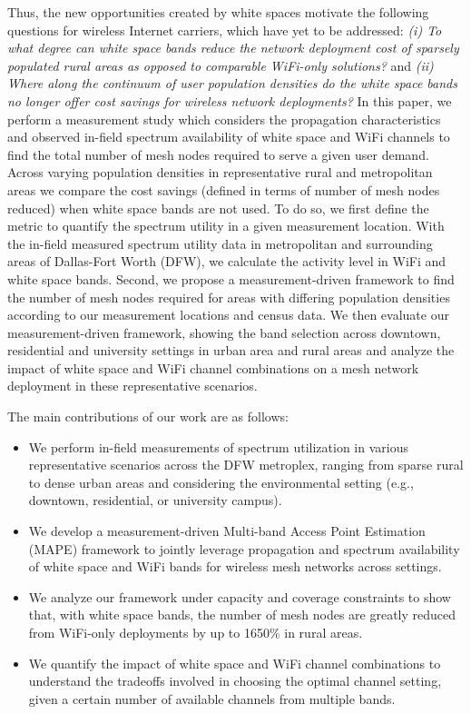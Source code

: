 Thus, the new opportunities created by white spaces motivate the following 
questions for wireless Internet carriers, which have yet to be addressed: 
{\it (i) To what degree can white space bands reduce the network deployment cost of
sparsely populated rural areas as opposed to comparable WiFi-only solutions?} and 
{\it (ii) Where along the continuum of user population densities do the white
space bands no longer offer cost savings for wireless network deployments?}
In this paper, we perform a measurement study which considers the propagation 
characteristics and observed in-field spectrum availability of white space
and WiFi channels to find the total number of mesh nodes required to serve a 
given user demand. Across varying population densities in representative 
rural and metropolitan areas we compare the cost savings (defined in terms of
number of mesh nodes reduced) when white space bands are not used.
To do so, we first define the metric to quantify the spectrum utility in a
given measurement location. With the in-field measured spectrum utility data 
in metropolitan and surrounding areas of Dallas-Fort Worth (DFW), we 
calculate the activity level in WiFi and white space bands. Second, we 
propose a measurement-driven framework to find the number of mesh nodes required 
for areas with differing population densities according to our measurement locations
and census data. We then evaluate our measurement-driven framework, showing
the band selection across downtown, residential and university settings in
urban area and rural areas and analyze the impact of white space and WiFi
channel combinations on a mesh network deployment in these representative scenarios.

The main contributions of our work are as follows:
\begin{itemize}
\item We perform in-field measurements of spectrum utilization in various representative
scenarios across the DFW metroplex, ranging from sparse rural to dense urban areas and 
considering the environmental setting (e.g., downtown, residential, or university campus).
\item We develop a measurement-driven Multi-band Access Point Estimation (MAPE) framework 
to jointly leverage propagation and spectrum availability of white space and WiFi bands 
for wireless mesh networks across settings.
\item We analyze our framework under capacity and coverage constraints 
to show that, with white space bands, the number of mesh nodes are greatly
reduced from WiFi-only deployments by up to 1650\% in rural areas.
\item We quantify the impact of white space and WiFi channel
combinations to understand the tradeoffs involved in choosing the optimal channel setting,
given a certain number of available channels from multiple bands.
\end{itemize}


